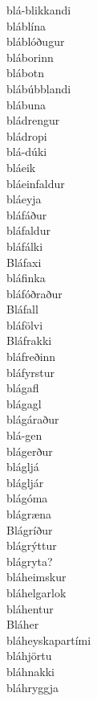 \documentclass[../samsetningasafn.tex]{subfiles}
\begin{document}
\begin{bigwordlist}
\begin{footnotesize}
\begin{multicols}{4}
\begin{description}
		\item [blá-blikkandi]
		\item [bláblína]
		\item [bláblóðugur]
		\item [bláborinn]
		\item [blábotn]
		\item [blábúbblandi]
		\item [blábuna]
		\item [bládrengur]
		\item [bládropi]
		\item [blá-dúki]
		\item [bláeik]
		\item [bláeinfaldur]
		\item [bláeyja]
		\item [bláfáður]
		\item [bláfaldur]
		\item [bláfálki]
		\item [Bláfaxi]
		\item [bláfinka]
		\item [bláfóðraður]
		\item [Bláfall]
		\item [bláfölvi]
		\item [Bláfrakki]
		\item [bláfreðinn]
		\item [bláfyrstur]
		\item [blágafl]
		\item [blágagl]
		\item [blágáraður]
		\item [blá-gen]
		\item [blágerður]
		\item [blágljá]
		\item [blágljár]
		\item [blágóma]
		\item [blágræna]
		\item [Blágríður]
		\item [blágrýttur]
		\item [blágryta?]
		\item [bláheimskur]
		\item [bláhelgarlok]
		\item [bláhentur]
		\item [Bláher]
		\item [bláheyskapartími]
		\item [bláhjörtu]
		\item [bláhnakki]
		\item [bláhryggja]

\end{description}
\end{multicols}
\end{footnotesize}
\end{bigwordlist}
\end{document}
